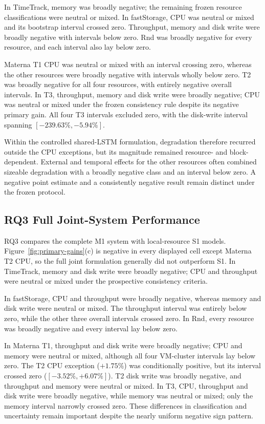 \documentclass[a4paper,fleqn]{cas-dc}
\begin{document}
In TimeTrack, memory was broadly negative; the remaining frozen resource
classifications were neutral or mixed. In fastStorage, CPU was neutral or
mixed and its bootstrap interval crossed zero. Throughput, memory and disk
write were broadly negative with intervals below zero. Rnd was broadly
negative for every resource, and each interval also lay below zero.

Materna T1 CPU was neutral or mixed with an interval crossing zero, whereas
the other resources were broadly negative with intervals wholly below zero.
T2 was broadly negative for all four resources, with entirely negative
overall intervals. In T3, throughput, memory and disk write were broadly
negative; CPU was neutral or mixed under the frozen consistency rule despite
its negative primary gain. All four T3 intervals excluded zero, with the
disk-write interval spanning $[-239.63\%,-5.94\%]$.

Within the controlled shared-LSTM formulation, degradation therefore recurred
outside the CPU exceptions, but its magnitude remained resource- and
block-dependent. External and temporal effects for the other resources often
combined sizeable degradation with a broadly negative class and an interval
below zero. A negative point estimate and a consistently negative result
remain distinct under the frozen protocol.

\subsection{RQ3 Full Joint-System Performance}
\label{sec:results-rq3}

RQ3 compares the complete M1 system with local-resource S1 models.
Figure~\ref{fig:primary-gains}(c) is negative in every displayed cell except
Materna T2 CPU, so the full joint formulation generally did not outperform S1.
In TimeTrack, memory and disk write were broadly negative; CPU and throughput
were neutral or mixed under the prospective consistency criteria.

In fastStorage, CPU and throughput were broadly negative, whereas memory and
disk write were neutral or mixed. The throughput interval was entirely below
zero, while the other three overall intervals crossed zero. In Rnd, every
resource was broadly negative and every interval lay below zero.

In Materna T1, throughput and disk write were broadly negative; CPU and memory
were neutral or mixed, although all four VM-cluster intervals lay below zero.
The T2 CPU exception ($+1.75\%$) was conditionally positive, but its interval
crossed zero ($[-3.52\%,+6.07\%]$). T2 disk write was broadly negative, and
throughput and memory were neutral or mixed. In T3, CPU, throughput and disk
write were broadly negative, while memory was neutral or mixed; only the
memory interval narrowly crossed zero. These differences in classification
and uncertainty remain important despite the nearly uniform negative sign
pattern.
\end{document}
